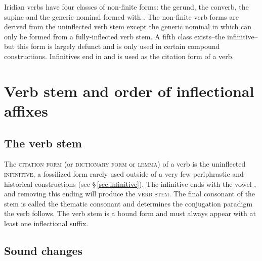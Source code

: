 Iridian verbs have four classes of non-finite forms: the gerund, the converb,
the supine and the generic nominal formed with . The non-finite verb
forms are derived from the uninflected verb stem except the generic nominal in
 which can only be formed from a fully-inflected verb stem. A fifth
class exists--the infinitive--but this form is largely defunct and is only used
in certain compound constructions. Infinitives end in  and is used as
the citation form of a verb.

\section{Verb stem and order of inflectional affixes}


\subsection{The verb stem}

The {\scshape citation form} (or {\scshape dictionary form} or {\scshape lemma}) of
a verb is the uninflected {\scshape infinitive}, a fossilized
form rarely used outside of a very few periphrastic and
historical constructions (see \S\,\ref{sec:infinitive}). The infinitive ends
with the vowel , and removing this ending will produce the {\scshape
verb stem}. The final consonant  of the stem is called the
thematic consonant and determines the conjugation
paradigm the verb follows. The verb stem is a bound form and must always appear
with at least one inflectional suffix.

\subsection{Sound changes}\label{sec:sound-changes}

